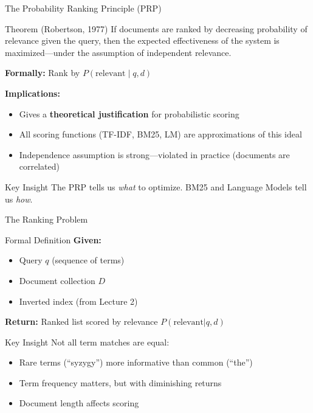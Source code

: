 \documentclass[aspectratio=169]{beamer}
\begin{document}
\begin{frame}[shrink=5]{The Probability Ranking Principle (PRP)}
\begin{block}{Theorem (Robertson, 1977)}
If documents are ranked by decreasing probability of relevance given the query, then the expected effectiveness of the system is maximized---under the assumption of independent relevance.
\end{block}

\vspace{1em}

\textbf{Formally:} Rank by $P(\text{relevant} \mid q, d)$

\vspace{1em}

\textbf{Implications:}
\begin{itemize}
    \item Gives a \textbf{theoretical justification} for probabilistic scoring
    \item All scoring functions (TF-IDF, BM25, LM) are approximations of this ideal
    \item Independence assumption is strong---violated in practice (documents are correlated)
\end{itemize}

\vspace{0.5em}

\begin{exampleblock}{Key Insight}
The PRP tells us \emph{what} to optimize. BM25 and Language Models tell us \emph{how}.
\end{exampleblock}
\end{frame}

\begin{frame}[shrink=5]{The Ranking Problem}
\begin{block}{Formal Definition}
\textbf{Given:}
\begin{itemize}
    \item Query $q$ (sequence of terms)
    \item Document collection $D$
    \item Inverted index (from Lecture 2)
\end{itemize}

\vspace{0.5em}
\textbf{Return:} Ranked list scored by relevance $P(\text{relevant}|q,d)$
\end{block}

\vspace{1em}

\begin{exampleblock}{Key Insight}
Not all term matches are equal:
\begin{itemize}
    \item Rare terms (``syzygy'') more informative than common (``the'')
    \item Term frequency matters, but with diminishing returns
    \item Document length affects scoring
\end{itemize}
\end{exampleblock}
\end{frame}
\end{document}
